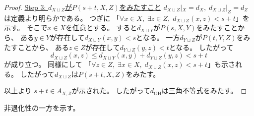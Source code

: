 \documentclass[report, notitlepage]{jlreq}
\newcommand{\GH}{\mathrm{GH}}
\begin{document}
\begin{proof}
    \uline{Step 3: $d_{X \sqcup Z}$が$P(s + t, X, Z)$をみたすこと} \quad
    $d_{X \sqcup Z}|_X = d_X, \;
        d_{X \sqcup Z}|_Z = d_Z$
    は定義より明らかである。
    つぎに
    「$\forall x \in X, \; \exists z \in Z, \; d_{X \sqcup Z}(x, z) < s + t$」を示す。
    そこで$x \in X$を任意とする。
    すると$d_{X \sqcup Y}$が$P(s, X, Y)$をみたすことから、
    ある$y \in Y$が存在して$d_{X \sqcup Y}(x, y) < s$となる。
    一方$d_{Y \sqcup Z}$が$P(t, Y, Z)$をみたすことから、
    ある$z \in Z$が存在して$d_{Y \sqcup Z}(y, z) < t$となる。
    したがって
    \begin{equation}
        d_{X \sqcup Z}(x, z)
            \le
                d_{X \sqcup Y}(x, y) + d_{Y \sqcup Z}(y, z)
            <
                s + t
    \end{equation}
    が成り立つ。
    同様にして
    「$\forall z \in Z, \; \exists x \in X, \; d_{X \sqcup Z}(x, z) < s + t$」も示される。
    したがって$d_{X \sqcup Z}$は$P(s + t, X, Z)$をみたす。

    以上より
    $s + t \in A_{X, Z}$が示された。
    したがって$d_\GH$は三角不等式をみたす。
\end{proof}

非退化性の一方を示す。

\end{document}
